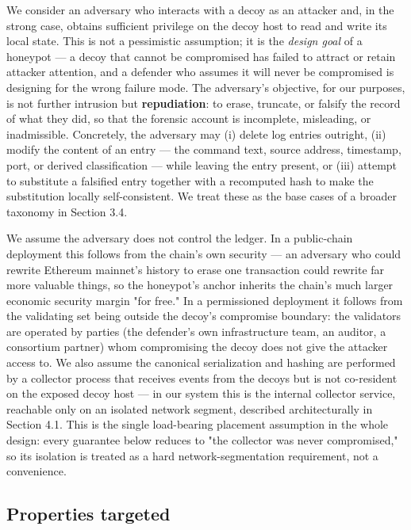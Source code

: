 \documentclass[journal]{IEEEtran}
\begin{document}
We consider an adversary who interacts with a decoy as an attacker and, in the strong case, obtains sufficient privilege on the decoy host to read and write its local state. This is not a pessimistic assumption; it is the \emph{design goal} of a honeypot --- a decoy that cannot be compromised has failed to attract or retain attacker attention, and a defender who assumes it will never be compromised is designing for the wrong failure mode. The adversary's objective, for our purposes, is not further intrusion but \textbf{repudiation}: to erase, truncate, or falsify the record of what they did, so that the forensic account is incomplete, misleading, or inadmissible. Concretely, the adversary may (i) delete log entries outright, (ii) modify the content of an entry --- the command text, source address, timestamp, port, or derived classification --- while leaving the entry present, or (iii) attempt to substitute a falsified entry together with a recomputed hash to make the substitution locally self-consistent. We treat these as the base cases of a broader taxonomy in Section 3.4.

We assume the adversary does not control the ledger. In a public-chain deployment this follows from the chain's own security --- an adversary who could rewrite Ethereum mainnet's history to erase one transaction could rewrite far more valuable things, so the honeypot's anchor inherits the chain's much larger economic security margin "for free." In a permissioned deployment it follows from the validating set being outside the decoy's compromise boundary: the validators are operated by parties (the defender's own infrastructure team, an auditor, a consortium partner) whom compromising the decoy does not give the attacker access to. We also assume the canonical serialization and hashing are performed by a collector process that receives events from the decoys but is not co-resident on the exposed decoy host --- in our system this is the internal collector service, reachable only on an isolated network segment, described architecturally in Section 4.1. This is the single load-bearing placement assumption in the whole design: every guarantee below reduces to "the collector was never compromised," so its isolation is treated as a hard network-segmentation requirement, not a convenience.

\subsection{Properties targeted}
\end{document}
